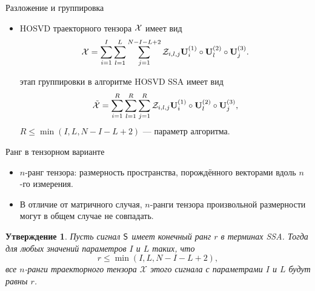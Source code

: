 \documentclass[ucs, notheorems, handout]{beamer}
\newcommand{\bluetext}[1]{{\usebeamercolor[fg]{bluetext_color}#1}}
\newtheorem{statement}{Утверждение}
\begin{document}
    \begin{frame}{Разложение и группировка}
        \begin{itemize}
            \item HOSVD траекторного тензора $\mathcal{X}$ имеет вид
            \[
                \mathcal{X} = \sum_{i=1}^{I} \sum_{l=1}^{L} \sum_{j=1}^{N-I-L+2} \mathcal{Z}_{i,l,j} \mathbf{U}^{(1)}_{i}
                \circ \mathbf{U}^{(2)}_{l} \circ \mathbf{U}^{(3)}_{j}.
            \]

            \vspace{0.6cm}
             этап группировки в алгоритме HOSVD SSA имеет вид
            \[
                \tilde{\mathcal{X}} = \sum_{i=1}^{R} \sum_{l=1}^{R} \sum_{j=1}^{R} \mathcal{Z}_{i,l,j} \mathbf{U}^{(1)}_{i}
                \circ \mathbf{U}^{(2)}_{l} \circ \mathbf{U}^{(3)}_{j},
            \]
            $R\leqslant \min(I, L, N - I - L + 2)$ --- параметр алгоритма.
        \end{itemize}
    \end{frame}

    \begin{frame}{Ранг в тензорном варианте}
        \begin{itemize}
            \item \bluetext{$n$-ранг тензора:} размерность пространства, порождённого
            векторами вдоль $n$-го измерения.

            \item В отличие от матричного случая, $n$-ранги тензора произвольной размерности могут в общем случае
            не совпадать.
        \end{itemize}

        \begin{statement}
            Пусть сигнал $\mathsf{S}$ имеет конечный ранг $r$ в терминах \emph{SSA}\@.
            Тогда для любых значений параметров $I$ и $L$ таких, что
            \[
                r\leqslant\min(I, L, N-I-L+2),
            \]
            все $n$-ранги траекторного тензора $\mathcal{X}$
            этого сигнала с параметрами $I$ и $L$ будут равны $r$.
        \end{statement}
    \end{frame}
\end{document}
